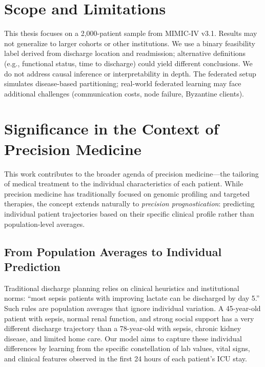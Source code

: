 \section{Scope and Limitations}

This thesis focuses on a 2,000-patient sample from MIMIC-IV v3.1. Results may not generalize to larger cohorts or other institutions. We use a binary feasibility label derived from discharge location and readmission; alternative definitions (e.g., functional status, time to discharge) could yield different conclusions. We do not address causal inference or interpretability in depth. The federated setup simulates disease-based partitioning; real-world federated learning may face additional challenges (communication costs, node failure, Byzantine clients).

\section{Significance in the Context of Precision Medicine}

This work contributes to the broader agenda of precision medicine---the tailoring of medical treatment to the individual characteristics of each patient. While precision medicine has traditionally focused on genomic profiling and targeted therapies, the concept extends naturally to \emph{precision prognostication}: predicting individual patient trajectories based on their specific clinical profile rather than population-level averages.

\subsection{From Population Averages to Individual Prediction}

Traditional discharge planning relies on clinical heuristics and institutional norms: ``most sepsis patients with improving lactate can be discharged by day 5.'' Such rules are population averages that ignore individual variation. A 45-year-old patient with sepsis, normal renal function, and strong social support has a very different discharge trajectory than a 78-year-old with sepsis, chronic kidney disease, and limited home care. Our model aims to capture these individual differences by learning from the specific constellation of lab values, vital signs, and clinical features observed in the first 24 hours of each patient's ICU stay.

